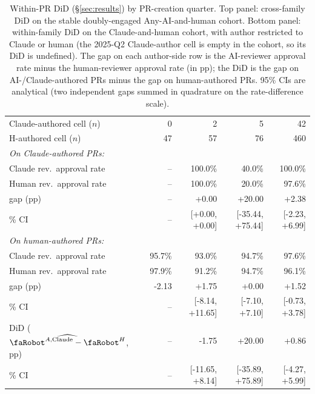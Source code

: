 \begin{table}[h]
\begin{tabular}{lrrrr}
\quad Claude-authored cell ($n$)  & 0{}   & 2{}   & 5{}   & 42{}   \\
\quad H-authored cell ($n$)       & 47{}   & 57{}   & 76{}   & 460{}   \\
\multicolumn{5}{l}{\emph{On Claude-authored PRs:}} \\
\quad Claude rev.\ approval rate     & --{}   & 100.0\%{}   & 40.0\%{}   & 100.0\%{}   \\
\quad Human rev.\ approval rate      & --{}   & 100.0\%{}   & 20.0\%{}   & 97.6\%{}   \\
\quad gap (pp)                       & --{}   & +0.00{}   & +20.00{}   & +2.38{}   \\
\qquad 95\% CI                       & --{} & [+0.00, +0.00]{} & [-35.44, +75.44]{} & [-2.23, +6.99]{} \\
\multicolumn{5}{l}{\emph{On human-authored PRs:}} \\
\quad Claude rev.\ approval rate     & 95.7\%{}   & 93.0\%{}   & 94.7\%{}   & 97.6\%{}   \\
\quad Human rev.\ approval rate      & 97.9\%{}   & 91.2\%{}   & 94.7\%{}   & 96.1\%{}   \\
\quad gap (pp)                       & -2.13{}   & +1.75{}   & +0.00{}   & +1.52{}   \\
\qquad 95\% CI                       & --{} & [-8.14, +11.65]{} & [-7.10, +7.10]{} & [-0.73, +3.78]{} \\
DiD ($\widehat{\rbt^{A,\text{Claude}} - \rbt^H}$, pp) & --{}  & -1.75{}  & +20.00{}  & +0.86{}  \\
\quad 95\% CI                       & --{}& [-11.65, +8.14]{}& [-35.89, +75.89]{}& [-4.27, +5.99]{}\\
\bottomrule
\end{tabular}
\caption{Within-PR DiD (\S\ref{sec:results}) by PR-creation quarter. Top panel: cross-family DiD on the stable doubly-engaged Any-AI-and-human cohort. Bottom panel: within-family DiD on the Claude-and-human cohort, with author restricted to Claude or human (the 2025-Q2 Claude-author cell is empty in the cohort, so its DiD is undefined). The gap on each author-side row is the AI-reviewer approval rate minus the human-reviewer approval rate (in pp); the DiD is the gap on AI-/Claude-authored PRs minus the gap on human-authored PRs. 95\% CIs are analytical (two independent gaps summed in quadrature on the rate-difference scale).}
\label{tab:rq3-quarterly}
\end{table}
